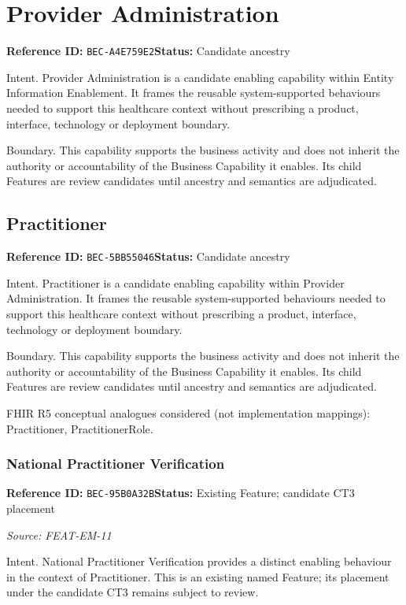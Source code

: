 \documentclass[11pt,a4paper,openany]{book}
\begin{document}
\section{Provider Administration}\label{cap:bec-a4e759e2}
\noindent\textbf{Reference ID:} \texttt{BEC-A4E759E2}\quad \textbf{Status:} Candidate ancestry\par
Intent. Provider Administration is a candidate enabling capability within Entity Information Enablement. It frames the reusable system-supported behaviours needed to support this healthcare context without prescribing a product, interface, technology or deployment boundary.

Boundary. This capability supports the business activity and does not inherit the authority or accountability of the Business Capability it enables. Its child Features are review candidates until ancestry and semantics are adjudicated.

\subsection{Practitioner}\label{cap:bec-5bb55046}
\noindent\textbf{Reference ID:} \texttt{BEC-5BB55046}\quad \textbf{Status:} Candidate ancestry\par
Intent. Practitioner is a candidate enabling capability within Provider Administration. It frames the reusable system-supported behaviours needed to support this healthcare context without prescribing a product, interface, technology or deployment boundary.

Boundary. This capability supports the business activity and does not inherit the authority or accountability of the Business Capability it enables. Its child Features are review candidates until ancestry and semantics are adjudicated.

FHIR R5 conceptual analogues considered (not implementation mappings): Practitioner, PractitionerRole.

\subsubsection{National Practitioner Verification}\label{cap:bec-95b0a32b}
\noindent\textbf{Reference ID:} \texttt{BEC-95B0A32B}\quad \textbf{Status:} Existing Feature; candidate CT3 placement\par
\noindent\textit{Source: FEAT-EM-11}\par
Intent. National Practitioner Verification provides a distinct enabling behaviour in the context of Practitioner. This is an existing named Feature; its placement under the candidate CT3 remains subject to review.
\end{document}
